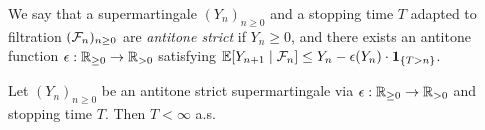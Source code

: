 \iffalse
\lo{An aside: This CBV $\tY$-rule seems cleaner:
\[
\big(\tY f^{A \to B} \, x^A \, . \, \theta^B \big) \, v \to \theta[(\tY f \, x \, . \, \theta) / f, v / x].
\]
We assume $\tY f^{A \to B} \, x^A \, . \, \theta^B$ is a value.}
\fi

\begin{definition}
We say that a supermartingale $(Y_n)_{n \geq 0}$ and a stopping time $T$ adapted to filtration $(\mathcal{F}_n)_{n \geq 0}$ are \emph{antitone strict} if $Y_n \geq 0$, and there exists an antitone function $\epsilon : \mathbb{R}_{{\geq}0} \to \mathbb{R}_{{>}0}$ satisfying
\(
\mathbb{E}[Y_{n+1} \mid \mathcal{F}_n] \leq Y_n - \epsilon (Y_n) \cdot {\bf 1}_{\{T > n\}}
\).
\end{definition}


\begin{theorem}
\label{thm:a-c strict}
Let $(Y_n)_{n \geq 0}$ be an antitone strict supermartingale via $\epsilon : \mathbb{R}_{{\geq}0} \to \mathbb{R}_{{>}0}$ and stopping time $T$. 
Then $T < \infty$ a.s.
\end{theorem}

